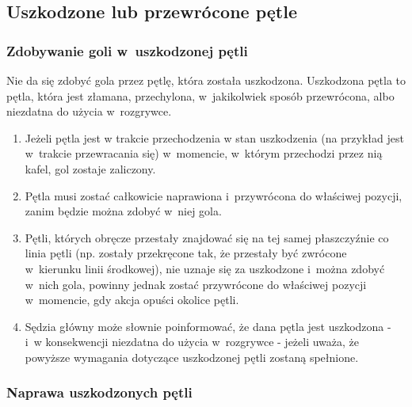 \documentclass[12pt,a4paper]{article}
\begin{document}
\subsection{Uszkodzone lub przewrócone pętle}

\subsubsection{Zdobywanie goli w~uszkodzonej pętli}
Nie da się zdobyć
gola przez pętlę, która została uszkodzona. Uszkodzona pętla to pętla, która
jest złamana, przechylona, w~jakikolwiek sposób przewrócona, albo
niezdatna do użycia w~rozgrywce.

\begin{enumerate}
	\item
	      Jeżeli pętla jest w trakcie przechodzenia w stan uszkodzenia (na przykład jest w~trakcie
	      przewracania się) w~momencie, w~którym przechodzi przez nią kafel, gol
	      zostaje zaliczony.
	\item
	      Pętla musi zostać całkowicie naprawiona i~przywrócona do właściwej
	      pozycji, zanim będzie można zdobyć w~niej gola.
	\item
	      Pętli, których obręcze przestały znajdować się na tej samej
	      płaszczyźnie co linia pętli (np. zostały przekręcone tak, że przestały
	      być zwrócone w~kierunku linii środkowej), nie uznaje się za uszkodzone
	      i~można zdobyć w~nich gola, powinny jednak zostać przywrócone do
	      właściwej pozycji w~momencie, gdy akcja opuści okolice pętli.
	\item
	      Sędzia główny może słownie poinformować, że dana pętla jest
	      uszkodzona - i~w konsekwencji niezdatna do użycia w~rozgrywce - jeżeli
	      uważa, że powyższe wymagania dotyczące uszkodzonej pętli zostaną
	      spełnione.
\end{enumerate}

\subsubsection{Naprawa uszkodzonych pętli}
\end{document}
